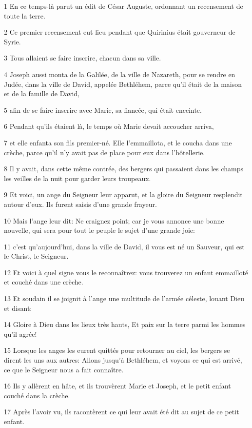 \par 1 En ce temps-là parut un édit de César Auguste, ordonnant un recensement de toute la terre.
\par 2 Ce premier recensement eut lieu pendant que Quirinius était gouverneur de Syrie.
\par 3 Tous allaient se faire inscrire, chacun dans sa ville.
\par 4 Joseph aussi monta de la Galilée, de la ville de Nazareth, pour se rendre en Judée, dans la ville de David, appelée Bethléhem, parce qu'il était de la maison et de la famille de David,
\par 5 afin de se faire inscrire avec Marie, sa fiancée, qui était enceinte.
\par 6 Pendant qu'ils étaient là, le temps où Marie devait accoucher arriva,
\par 7 et elle enfanta son fils premier-né. Elle l'emmaillota, et le coucha dans une crèche, parce qu'il n'y avait pas de place pour eux dans l'hôtellerie.
\par 8 Il y avait, dans cette même contrée, des bergers qui passaient dans les champs les veilles de la nuit pour garder leurs troupeaux.
\par 9 Et voici, un ange du Seigneur leur apparut, et la gloire du Seigneur resplendit autour d'eux. Ils furent saisis d'une grande frayeur.
\par 10 Mais l'ange leur dit: Ne craignez point; car je vous annonce une bonne nouvelle, qui sera pour tout le peuple le sujet d'une grande joie:
\par 11 c'est qu'aujourd'hui, dans la ville de David, il vous est né un Sauveur, qui est le Christ, le Seigneur.
\par 12 Et voici à quel signe vous le reconnaîtrez: vous trouverez un enfant emmailloté et couché dans une crèche.
\par 13 Et soudain il se joignit à l'ange une multitude de l'armée céleste, louant Dieu et disant:
\par 14 Gloire à Dieu dans les lieux très hauts, Et paix sur la terre parmi les hommes qu'il agrée!
\par 15 Lorsque les anges les eurent quittés pour retourner au ciel, les bergers se dirent les uns aux autres: Allons jusqu'à Bethléhem, et voyons ce qui est arrivé, ce que le Seigneur nous a fait connaître.
\par 16 Ils y allèrent en hâte, et ils trouvèrent Marie et Joseph, et le petit enfant couché dans la crèche.
\par 17 Après l'avoir vu, ils racontèrent ce qui leur avait été dit au sujet de ce petit enfant.
